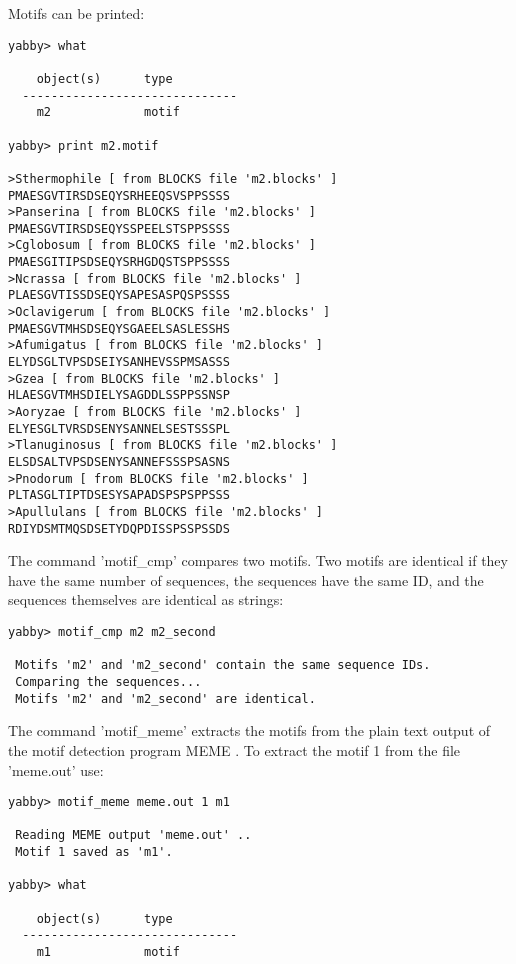 Motifs can be printed:

\begin{verbatim}
yabby> what      

    object(s)      type
  ------------------------------
    m2             motif         

yabby> print m2.motif

>Sthermophile [ from BLOCKS file 'm2.blocks' ]
PMAESGVTIRSDSEQYSRHEEQSVSPPSSSS
>Panserina [ from BLOCKS file 'm2.blocks' ]
PMAESGVTIRSDSEQYSSPEELSTSPPSSSS
>Cglobosum [ from BLOCKS file 'm2.blocks' ]
PMAESGITIPSDSEQYSRHGDQSTSPPSSSS
>Ncrassa [ from BLOCKS file 'm2.blocks' ]
PLAESGVTISSDSEQYSAPESASPQSPSSSS
>Oclavigerum [ from BLOCKS file 'm2.blocks' ]
PMAESGVTMHSDSEQYSGAEELSASLESSHS
>Afumigatus [ from BLOCKS file 'm2.blocks' ]
ELYDSGLTVPSDSEIYSANHEVSSPMSASSS
>Gzea [ from BLOCKS file 'm2.blocks' ]
HLAESGVTMHSDIELYSAGDDLSSPPSSNSP
>Aoryzae [ from BLOCKS file 'm2.blocks' ]
ELYESGLTVRSDSENYSANNELSESTSSSPL
>Tlanuginosus [ from BLOCKS file 'm2.blocks' ]
ELSDSALTVPSDSENYSANNEFSSSPSASNS
>Pnodorum [ from BLOCKS file 'm2.blocks' ]
PLTASGLTIPTDSESYSAPADSPSPSPPSSS
>Apullulans [ from BLOCKS file 'm2.blocks' ]
RDIYDSMTMQSDSETYDQPDISSPSSPSSDS
\end{verbatim}


The command 'motif\_cmp' compares two motifs. Two motifs are
identical if they have the same number of sequences, the sequences
have the same ID, and the sequences themselves are identical
as strings:

\begin{verbatim}
yabby> motif_cmp m2 m2_second

 Motifs 'm2' and 'm2_second' contain the same sequence IDs.
 Comparing the sequences...
 Motifs 'm2' and 'm2_second' are identical.
\end{verbatim}


The command 'motif\_meme' extracts the motifs from the plain
text output of the motif detection program MEME \cite{meme}.
To extract the motif 1 from the file 'meme.out' use:

\begin{verbatim}
yabby> motif_meme meme.out 1 m1 

 Reading MEME output 'meme.out' ..
 Motif 1 saved as 'm1'.

yabby> what

    object(s)      type
  ------------------------------
    m1             motif         
\end{verbatim}

